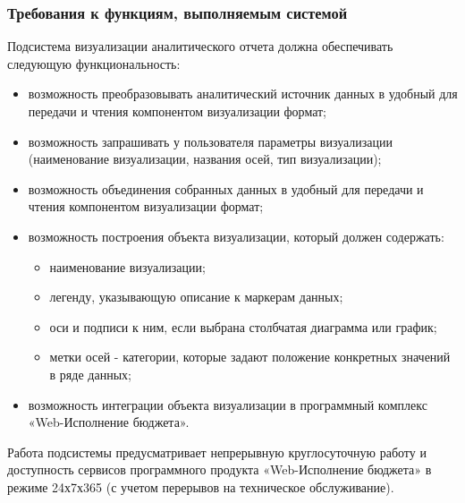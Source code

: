 \documentclass[a4paper]{extarticle}
\begin{document}
\subsubsection{Требования к функциям, выполняемым системой}
Подсистема визуализации аналитического отчета должна обеспечивать следующую функциональность:\par
\begin{itemize}
  \item возможность преобразовывать аналитический источник данных в удобный для передачи и чтения компонентом визуализации формат;
  \item возможность запрашивать у пользователя параметры визуализации (наименование визуализации, названия осей, тип визуализации);
  \item возможность объединения собранных данных в удобный для передачи и чтения компонентом визуализации формат;
  \item возможность построения объекта визуализации, который должен содержать:
    \begin{itemize}
    	\item наименование визуализации;
        \item легенду, указывающую описание к маркерам данных;
    	\item оси и подписи к ним, если выбрана столбчатая диаграмма или график;
        \item метки осей - категории, которые задают положение конкретных значений в ряде данных;
    \end{itemize}
  \item возможность интеграции объекта визуализации в программный комплекс «Web-Исполнение бюджета».
\end{itemize}\par
Работа подсистемы предусматривает непрерывную круглосуточную работу и доступность сервисов программного продукта «Web-Исполнение бюджета» в режиме 24х7х365 (с учетом перерывов на техническое обслуживание).
\end{document}
